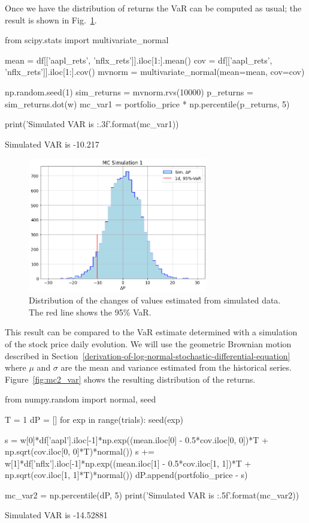 Once we have the distribution of returns the VaR can be computed as usual; the result is shown in Fig.~\ref{fig:mc1_var}.

\begin{ipython}
from scipy.stats import multivariate_normal

mean = df[['aapl_rets', 'nflx_rets']].iloc[1:].mean()
cov = df[['aapl_rets', 'nflx_rets']].iloc[1:].cov()
mvnorm = multivariate_normal(mean=mean, cov=cov)

np.random.seed(1)
sim_returns = mvnorm.rvs(10000)
p_returns = sim_returns.dot(w)
mc_var1 = portfolio_price * np.percentile(p_returns, 5)

print('Simulated VAR is {:.3f}'.format(mc_var1))
\end{ipython}
\begin{ioutput}
Simulated VAR is -10.217
\end{ioutput}

\begin{figure}[htb]
\centering
\includegraphics[width=0.7\textwidth]{figures/sim1_var}
\caption{Distribution of the changes of values estimated from simulated data. The red line shows the 95\% VaR.}
\label{fig:mc1_var}
\end{figure}

This result can be compared to the VaR estimate determined with a simulation of the stock price daily evolution. We will use the geometric Brownian motion described in Section~\ref{derivation-of-log-normal-stochastic-differential-equation} where $\mu$ and $\sigma$ are the mean and variance estimated from the historical series. Figure~\ref{fig:mc2_var} shows the resulting distribution of the returns.

\begin{ipython}
from numpy.random import normal, seed

T = 1
dP = []
for exp in range(trials):
	seed(exp)

    s = w[0]*df['aapl'].iloc[-1]*np.exp((mean.iloc[0] - 0.5*cov.iloc[0, 0])*T + 
        np.sqrt(cov.iloc[0, 0]*T)*normal())
    s += w[1]*df['nflx'].iloc[-1]*np.exp((mean.iloc[1] - 0.5*cov.iloc[1, 1])*T + 
         np.sqrt(cov.iloc[1, 1]*T)*normal())
    dP.append(portfolio_price - s)

mc_var2 = np.percentile(dP, 5)
print('Simulated VAR is {:.5f}'.format(mc_var2))
\end{ipython}
\begin{ioutput}
Simulated VAR is -14.52881
\end{ioutput}

